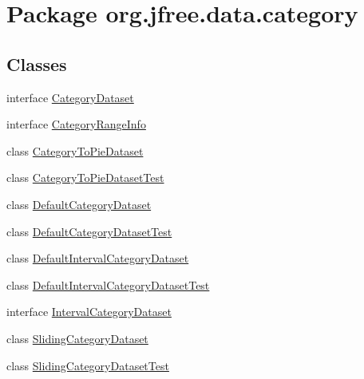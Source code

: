 \hypertarget{namespaceorg_1_1jfree_1_1data_1_1category}{}\section{Package org.\+jfree.\+data.\+category}
\label{namespaceorg_1_1jfree_1_1data_1_1category}
\subsection*{Classes}
\begin{DoxyCompactItemize}
\item 
interface \mbox{\hyperlink{interfaceorg_1_1jfree_1_1data_1_1category_1_1_category_dataset}{Category\+Dataset}}
\item 
interface \mbox{\hyperlink{interfaceorg_1_1jfree_1_1data_1_1category_1_1_category_range_info}{Category\+Range\+Info}}
\item 
class \mbox{\hyperlink{classorg_1_1jfree_1_1data_1_1category_1_1_category_to_pie_dataset}{Category\+To\+Pie\+Dataset}}
\item 
class \mbox{\hyperlink{classorg_1_1jfree_1_1data_1_1category_1_1_category_to_pie_dataset_test}{Category\+To\+Pie\+Dataset\+Test}}
\item 
class \mbox{\hyperlink{classorg_1_1jfree_1_1data_1_1category_1_1_default_category_dataset}{Default\+Category\+Dataset}}
\item 
class \mbox{\hyperlink{classorg_1_1jfree_1_1data_1_1category_1_1_default_category_dataset_test}{Default\+Category\+Dataset\+Test}}
\item 
class \mbox{\hyperlink{classorg_1_1jfree_1_1data_1_1category_1_1_default_interval_category_dataset}{Default\+Interval\+Category\+Dataset}}
\item 
class \mbox{\hyperlink{classorg_1_1jfree_1_1data_1_1category_1_1_default_interval_category_dataset_test}{Default\+Interval\+Category\+Dataset\+Test}}
\item 
interface \mbox{\hyperlink{interfaceorg_1_1jfree_1_1data_1_1category_1_1_interval_category_dataset}{Interval\+Category\+Dataset}}
\item 
class \mbox{\hyperlink{classorg_1_1jfree_1_1data_1_1category_1_1_sliding_category_dataset}{Sliding\+Category\+Dataset}}
\item 
class \mbox{\hyperlink{classorg_1_1jfree_1_1data_1_1category_1_1_sliding_category_dataset_test}{Sliding\+Category\+Dataset\+Test}}
\end{DoxyCompactItemize}
